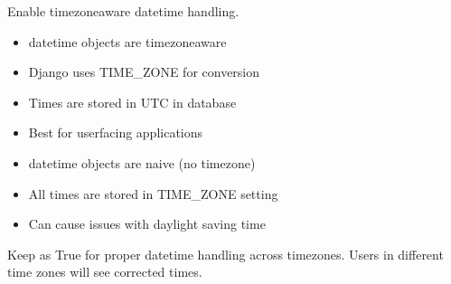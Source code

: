\documentclass[letterpaper,10pt,english]{sphinxmanual}
\begin{document}
\begin{fulllineitems}
\label{\detokenize{softwareProject:softwareProject.settings.USE_TZ}}
\pysigstartsignatures
\pysigline
{}
\pysigstopsignatures
\sphinxAtStartPar
Enable timezone\sphinxhyphen{}aware datetime handling.
\begin{description}
\begin{itemize}
\item {} 
\sphinxAtStartPar
datetime objects are timezone\sphinxhyphen{}aware

\item {} 
\sphinxAtStartPar
Django uses TIME\_ZONE for conversion

\item {} 
\sphinxAtStartPar
Times are stored in UTC in database

\item {} 
\sphinxAtStartPar
Best for user\sphinxhyphen{}facing applications

\end{itemize}

\begin{itemize}
\item {} 
\sphinxAtStartPar
datetime objects are naive (no timezone)

\item {} 
\sphinxAtStartPar
All times are stored in TIME\_ZONE setting

\item {} 
\sphinxAtStartPar
Can cause issues with daylight saving time

\end{itemize}

\sphinxAtStartPar
Keep as True for proper datetime handling across timezones.
Users in different time zones will see corrected times.

\end{description}

\end{fulllineitems}

\end{document}
